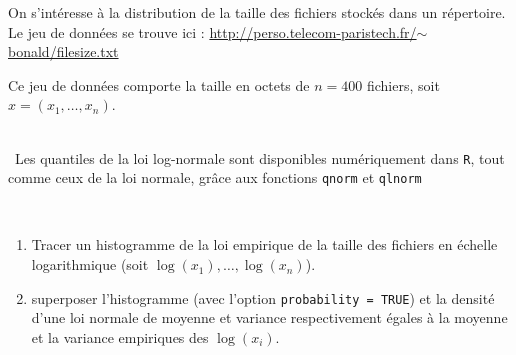 \documentclass[11pt,a4paper,oneside]{article}
\begin{document}
On s'intéresse à la distribution de la taille des fichiers stockés dans un répertoire. Le jeu de données se trouve ici :
\href{http://perso.telecom-paristech.fr/~bonald/filesize.txt}{http://perso.telecom-paristech.fr/$\sim$bonald/filesize.txt}

Ce jeu de données  comporte la taille en octets de $n = 400$ fichiers, soit $x = (x_1,\ldots,x_n)$.

~\\
\NB\ Les quantiles de la loi log-normale sont disponibles numériquement dans \texttt{R}, tout comme ceux de la loi normale, grâce aux fonctions \lstinline{qnorm} et \lstinline{qlnorm}

\begin{exercice}~

  \begin{enumerate}
    \item Tracer un histogramme de la loi empirique de la taille des fichiers en échelle logarithmique (soit $\log(x_1),\ldots,\log(x_n)$).
  \item superposer l'histogramme (avec l'option \lstinline+probability = TRUE+) et la densité d'une loi normale de moyenne et variance respectivement égales à la moyenne et la variance empiriques des $\log(x_i)$. 

\end{enumerate}  
\end{exercice}
\end{document}
